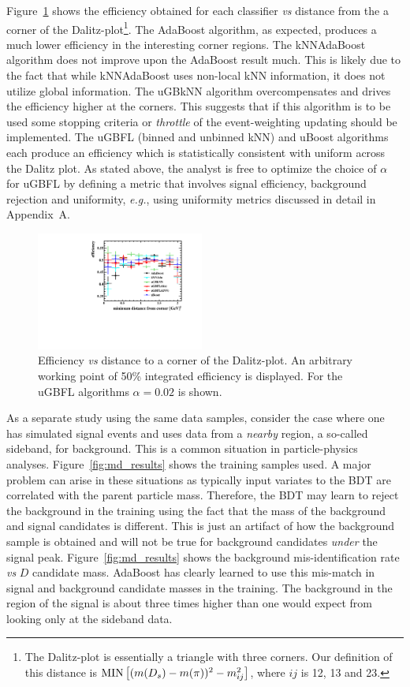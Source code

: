 Figure~\ref{fig:dalitz_results} shows the efficiency obtained for each classifier {\em vs} distance from the a corner of the Dalitz-plot\footnote{The Dalitz-plot is essentially a triangle with three corners. Our definition of this distance is ${\rm MIN}\left[(m(D_s)-m(\pi))^2 - m_{ij}^2\right]$, where $ij$ is 12, 13 and 23.}.  The AdaBoost algorithm, as expected, produces a much lower efficiency in the interesting corner regions.  The kNNAdaBoost algorithm does not improve upon the AdaBoost result much.  This is likely due to the fact that while kNNAdaBoost uses non-local kNN information, it does not utilize global information.  The uGBkNN algorithm overcompensates and drives the efficiency higher at the corners.  This suggests that if this algorithm is to be used some stopping criteria or {\em throttle} of the event-weighting updating should be implemented.  
The uGBFL (binned and unbinned kNN) and uBoost algorithms each produce an efficiency which is statistically consistent with uniform across the Dalitz plot.  
As stated above, the analyst is free to optimize the choice of $\alpha$ for uGBFL by defining a metric that involves signal efficiency, background rejection and uniformity, {\em e.g.}, using uniformity metrics discussed in detail in Appendix~A.  

\begin{figure}[] 
  \centering 
  \includegraphics[width=0.49\textwidth]{DP_compare.pdf}
  \caption{\label{fig:dalitz_results} Efficiency {\em vs} distance to a corner of the Dalitz-plot.  An arbitrary working point of 50\% integrated efficiency is displayed. For the uGBFL algorithms $\alpha=0.02$ is shown.}
\end{figure}


As a separate study using the same data samples, consider the case where one has simulated signal events and uses data from a {\em nearby} region, a so-called sideband, for background.  This is a common situation in particle-physics analyses.  Figure~\ref{fig:md_results} shows the training samples used.  A major problem can arise in these situations as typically input variates to the BDT are correlated with the parent particle mass.  Therefore, the BDT may learn to reject the background in the training using the fact that the mass of the background and signal candidates is different.  This is just an artifact of how the background sample is obtained and will not be true for background candidates {\em under} the signal peak.  Figure~\ref{fig:md_results} shows the background mis-identification rate {\em vs} $D$ candidate mass.  AdaBoost has clearly learned to use this mis-match in signal and background candidate masses in the training.   The background in the region of the signal is about three times higher than one would expect from looking only at the sideband data.  


